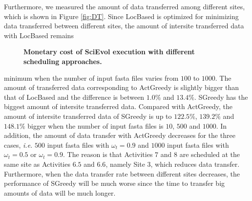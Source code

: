 Furthermore, we measured the amount of data transferred among different sites, which is shown in Figure \ref{fig:DT}. Since LocBased is optimized for minimizing data transferred between different sites, the amount of intersite transferred data with LocBased remains 
\begin{figure}[htbp]
\begin{centering}
\caption{\textbf{Monetary cost of SciEvol execution with different scheduling approaches.}}\label{fig:MC}
\end{centering}
\end{figure}
\noindent minimum when the number of input fasta files varies from $100$ to $1000$. The amount of transferred data corresponding to ActGreedy is slightly bigger than that of LocBased and the difference is between $1.0\%$ and $13.4\%$. SGreedy has the biggest amount of intersite transferred data. Compared with ActGreedy, the amount of intersite transferred data of SGreedy is up to $122.5\%$, $139.2\%$ and $148.1\%$ bigger when the number of input fasta files is $10$, $500$ and $1000$. In addition, the amount of data transfer with ActGreedy decreases for the three cases, \textit{i.e.} $500$ input fasta files with $\omega_t = 0.9$ and $1000$ input fasta files with $\omega_t = 0.5$ or $\omega_t = 0.9$. The reason is that Activities $7$ and $8$ are scheduled at the same site as Activities $6.5$ and $6.6$, namely Site $3$, which reduces data transfer. Furthermore, when the data transfer rate between different sites decreases, the performance of SGreedy will be much worse since the time to transfer big amounts of data will be much longer. 

